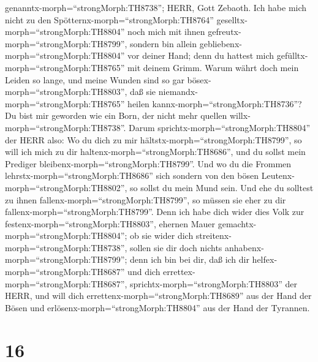 genanntx-morph=``strongMorph:TH8738''; HERR, Gott Zebaoth. 
Ich habe mich nicht zu den Spötternx-morph=``strongMorph:TH8764''
geselltx-morph=``strongMorph:TH8804'' noch mich mit ihnen
gefreutx-morph=``strongMorph:TH8799'', sondern bin allein
gebliebenx-morph=``strongMorph:TH8804'' vor deiner Hand; denn du hattest
mich gefülltx-morph=``strongMorph:TH8765'' mit deinem Grimm.
 Warum währt doch mein Leiden so lange, und meine Wunden
sind so gar bösex-morph=``strongMorph:TH8803'', daß sie
niemandx-morph=``strongMorph:TH8765'' heilen
kannx-morph=``strongMorph:TH8736''? Du bist mir geworden wie ein Born,
der nicht mehr quellen willx-morph=``strongMorph:TH8738''. 
Darum sprichtx-morph=``strongMorph:TH8804'' der HERR also: Wo du dich zu
mir hältstx-morph=``strongMorph:TH8799'', so will ich mich zu dir
haltenx-morph=``strongMorph:TH8686'', und du sollst mein Prediger
bleibenx-morph=``strongMorph:TH8799''. Und wo du die Frommen
lehrstx-morph=``strongMorph:TH8686'' sich sondern von den bösen
Leutenx-morph=``strongMorph:TH8802'', so sollst du mein Mund sein. Und
ehe du solltest zu ihnen fallenx-morph=``strongMorph:TH8799'', so müssen
sie eher zu dir fallenx-morph=``strongMorph:TH8799''.  Denn
ich habe dich wider dies Volk zur festenx-morph=``strongMorph:TH8803'',
ehernen Mauer gemachtx-morph=``strongMorph:TH8804''; ob sie wider dich
streitenx-morph=``strongMorph:TH8738'', sollen sie dir doch nichts
anhabenx-morph=``strongMorph:TH8799''; denn ich bin bei dir, daß ich dir
helfex-morph=``strongMorph:TH8687'' und dich
errettex-morph=``strongMorph:TH8687'',
sprichtx-morph=``strongMorph:TH8803'' der HERR,  und will
dich errettenx-morph=``strongMorph:TH8689'' aus der Hand der Bösen und
erlösenx-morph=``strongMorph:TH8804'' aus der Hand der Tyrannen.

\hypertarget{section-15}{%
\section{16}\label{section-15}}

